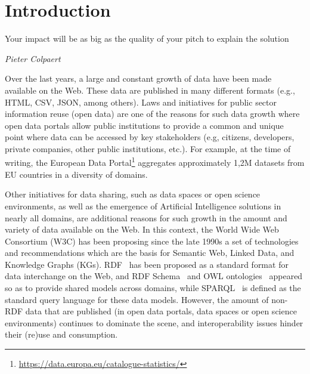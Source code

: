 \chapter{Introduction}
\label{chap:intro}

\epigraph{Your impact will be as big as the quality of your pitch to explain the solution}{\textit{Pieter Colpaert}}

Over the last years, a large and constant growth of data have been made available on the Web. These data are published in many different formats (e.g., HTML, CSV, JSON, among others). Laws and initiatives for public sector information reuse (open data) are one of the reasons for such data growth where open data portals allow public institutions to provide a common and unique point where data can be accessed by key stakeholders (e.g, citizens, developers, private companies, other public institutions, etc.). For example, at the time of writing, the European Data Portal\footnote{\url{https://data.europa.eu/catalogue-statistics/}} aggregates approximately 1,2M datasets from EU countries in a diversity of domains. 

Other initiatives for data sharing, such as data spaces or open science environments, as well as the emergence of Artificial Intelligence solutions in nearly all domains, are additional reasons for such growth in the amount and variety of data available on the Web. In this context, the World Wide Web Consortium (W3C) has been proposing since the late 1990s a set of technologies and recommendations which are the basis for Semantic Web, Linked Data, and Knowledge Graphs (KGs). RDF~\citep{brickley1999resource} has been proposed as a standard format for data interchange on the Web, and RDF Schema~\citep{brickley2014rdf} and OWL ontologies~\citep{mcguinness2004owl} appeared so as to provide shared models across domains, while SPARQL~\citep{perez2009semantics} is defined as the standard query language for these data models. However, the amount of non-RDF data that are published (in open data portals, data spaces or open science environments) continues to dominate the scene, and interoperability issues hinder their (re)use and consumption. 

